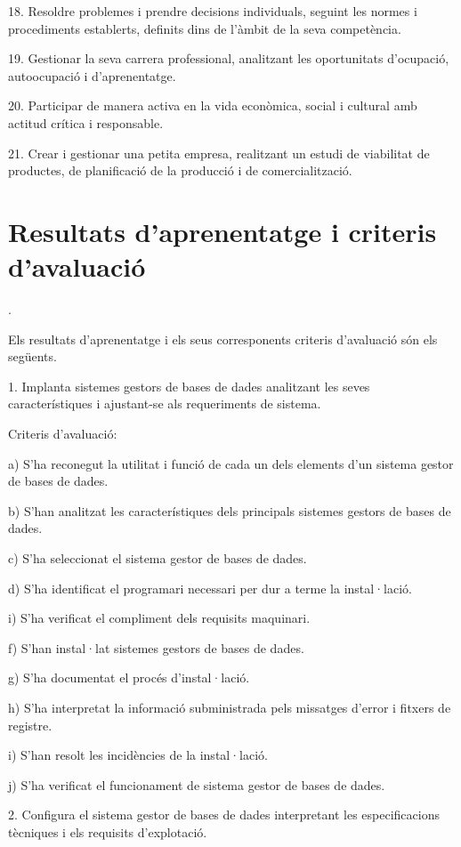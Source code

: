 \documentclass[catalan, a4paper, 12pt, titlepage]{article}
\begin{document}
18. Resoldre problemes i prendre decisions individuals, seguint les normes i procediments establerts, definits dins de l'àmbit de la seva competència.

19. Gestionar la seva carrera professional, analitzant les oportunitats d'ocupació, autoocupació i d'aprenentatge.

20. Participar de manera activa en la vida econòmica, social i cultural amb actitud crítica i responsable.

21. Crear i gestionar una petita empresa, realitzant un estudi de viabilitat de productes, de planificació de la producció i de comercialització.

\section{Resultats d'aprenentatge i criteris d'avaluació}
\label{ref:resultats}.

Els resultats d'aprenentatge i els seus corresponents criteris d'avaluació són els següents.

1. Implanta sistemes gestors de bases de dades analitzant les seves característiques i ajustant-se als requeriments de sistema.

Criteris d'avaluació:

a) S'ha reconegut la utilitat i funció de cada un dels elements d'un sistema gestor de bases de dades.

b) S'han analitzat les característiques dels principals sistemes gestors de bases de dades.

c) S'ha seleccionat el sistema gestor de bases de dades.

d) S'ha identificat el programari necessari per dur a terme la instal·lació.

i) S'ha verificat el compliment dels requisits maquinari.

f) S'han instal·lat sistemes gestors de bases de dades.

g) S'ha documentat el procés d'instal·lació.

h) S'ha interpretat la informació subministrada pels missatges d'error i fitxers de registre.

i) S'han resolt les incidències de la instal·lació.

j) S'ha verificat el funcionament de sistema gestor de bases de dades.

2. Configura el sistema gestor de bases de dades interpretant les especificacions tècniques i els requisits d'explotació.
\end{document}
